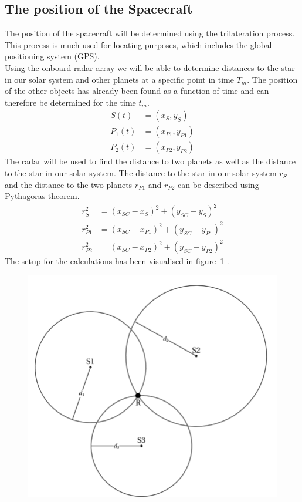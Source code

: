 \documentclass[reprint,english,notitlepage]{revtex4-2}
\begin{document}
\subsection{The position of the Spacecraft}\label{subsec:the-position-of-the-spacecraft}
The position of the spacecraft will be determined using the trilateration process.
This process is much used for locating purposes, which includes the global positioning system (GPS).\\
Using the onboard radar array we will be able to determine distances to the star in our solar system and other planets at a specific point in time $T_m$.
The position of the other objects has already been found as a function of time and can therefore be determined for the time $t_m$.\\
\begin{align*}
    S\left(t \right) &= \left(x_S, y_S \right)\\
	P_1\left(t \right) &= \left(x_{P1}, y_{P1} \right)\\
	P_2\left(t \right) &= \left(x_{P2}, y_{P2} \right)
\end{align*}
The radar will be used to find the distance to two planets as well as the distance to the star in our solar system.
The distance to the star in our solar system $r_S$ and the distance to the two planets $r_{P1}$ and $r_{P2}$ can be described using Pythagoras theorem.
\begin{align}
    r_S^2 &= (x_{SC} - x_S)^2 + (y_{SC} - y_S)^2 \label{r_s}\\
	r_{P1}^2 &= (x_{SC} - x_{P1})^2 + (y_{SC} - y_{P1})^2 \label{r_p1}\\
	r_{P2}^2 &= (x_{SC} - x_{P2})^2 + (y_{SC} - y_{P2})^2  \label{r_p2}
\end{align}
The setup for the calculations has been visualised in figure~\ref{fig:trilateration_figure} .
\begin{figure}[h]
	\centering
	\includegraphics[scale=0.2]{Figures/trilateration}
	\label{fig:trilateration_figure} %
\end{figure}
\end{document}
